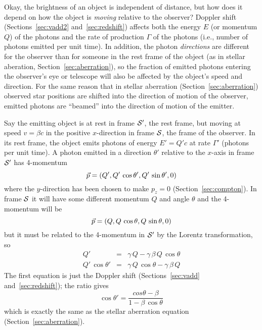 Okay, the brightness of an object is independent of distance, but how
does it depend on how the object is {\em moving\/} relative to the
observer?  Doppler shift (Sections~\ref{sec:vadd2}
and~\ref{sec:redshift}) affects both the energy $E$ (or momentum $Q$)
of the photons and the rate of production $\Gamma$ of the photons
(i.e., number of photons emitted per unit time).  In addition, the
photon {\em directions\/} are different for the observer than for
someone in the rest frame of the object (as in stellar aberation,
Section~\ref{sec:aberration}), so the fraction of emitted photons
entering the observer's eye or telescope will also be affected by the
object's speed and direction.  For the same reason that in stellar
aberration (Section~\ref{sec:aberration}) observed star positions are
shifted into the direction of motion of the observer, emitted photons
are ``beamed'' into the direction of motion of the emitter.

Say the emitting object is at rest in frame $\cal S'$, the rest
frame, but moving at speed $v=\beta c$ in the positive $x$-direction
in frame $\cal S$, the frame of the observer.  In its rest frame, the
object emits photons of energy $E'=Q'c$ at rate $\Gamma'$ (photons per
unit time).  A photon emitted in a direction $\theta'$ relative to the
$x$-axis in frame $\cal S'$ has 4-momentum
\begin{equation}
\vec{p}=(Q',Q'\,\cos\theta',Q'\,\sin\theta',0)
\end{equation}
where the $y$-direction has been chosen to make $p_z=0$
(Section~\ref{sec:compton}).  In frame $\cal S$ it will have some
different momentum $Q$ and angle $\theta$ and the 4-momentum will be
\begin{equation}
\vec{p}=(Q,Q\,\cos\theta,Q\,\sin\theta,0)
\end{equation}
but it must be related to the 4-momentum in $\cal S'$ by the Lorentz
transformation, so
\begin{eqnarray}
Q' & = & \gamma\,Q-\gamma\,\beta\,Q\,\cos\theta \nonumber \\
Q'\,\cos\theta' & = & \gamma\,Q\,\cos\theta-\gamma\,\beta\,Q
\end{eqnarray}
The first equation is just the Doppler shift (Sections~\ref{sec:vadd}
and~\ref{sec:redshift}); the ratio gives
\begin{equation}
\label{eqn:aber}
\cos\theta' = \frac{cos\theta-\beta}{1-\beta\,\cos\theta}
\end{equation}
which is exactly the same as the stellar aberration equation
(Section~\ref{sec:aberration}).

